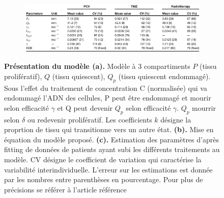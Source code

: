 \documentclass[12pt]{article}
\begin{document}
\begin{figure}
     \vspace{1cm}
    \begin{subfigure}[t]{\textwidth}
    \centering
        \includegraphics[width=\linewidth]{Image/tableau.JPG} 
        \caption{} \label{fig:tableau}
    \end{subfigure}
    
    \caption{\textbf{Présentation du modèle \cite{} (a).} Modèle à 3 compartiments $P$ (tissu prolifératif), $Q$ (tissu quiescent), $Q_{p}$ (tissu quiescent endommagé). Sous l'effet du traitement de concentration C (normalisée) qui va endommagé l'ADN des cellules, P peut être endommagé et mourir selon efficacité $\gamma$ et Q peut devenir $Q_p$ selon efficacité $\gamma$. $Q_{p}$ mourrir selon $\delta$ ou redevenir prolifératif. Les coefficients $k$ désigne la proprtion de tissu qui transitionne vers un autre état.  \textbf{(b).} Mise en équation du modèle proposé. \textbf{(c).} Estimation des paramètres d'après fitting de données de patients ayant subi les différents traitements au modèle. CV désigne le coefficient de variation qui caractérise la variabilité interindividuelle. L'erreur sur les estimations est donnée par les nombres entre parenthèses en pourcentage. Pour plus de précisions se référer à l'article référence\cite{}}
\end{figure}
\end{document}
